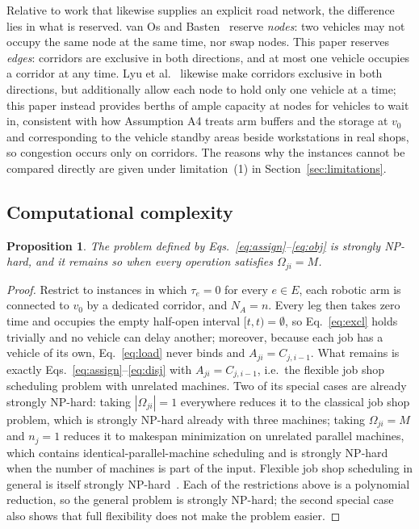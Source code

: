 \documentclass[manuscript,screen,review]{acmart}
\newtheorem{prop}{Proposition}
\begin{document}
Relative to work that likewise supplies an explicit road network, the difference lies in what is reserved. van Os and Basten~\cite{vanos2026exact}
reserve \emph{nodes}: two vehicles may not occupy the same node at the same time, nor swap nodes. This paper reserves \emph{edges}: corridors are exclusive in both directions, and at most one vehicle occupies a corridor at any time.
Lyu et al.~\cite{lyu2019approach} likewise make corridors exclusive in both directions, but additionally allow each node to hold only one vehicle at a time; this paper instead provides berths of ample capacity at nodes for vehicles to wait in, consistent with how Assumption A4 treats arm buffers and the storage at $v_0$ and corresponding to the vehicle standby areas beside workstations in real shops, so congestion occurs only on corridors.
The reasons why the instances cannot be compared directly are given under limitation~(1) in Section~\ref{sec:limitations}.

\subsection{Computational complexity}

\begin{prop}
\label{prop:np_hard}
The problem defined by Eqs.~\eqref{eq:assign}--\eqref{eq:obj} is strongly NP-hard, and it remains so when every operation satisfies
$\Omega_{ji}=M$.
\end{prop}

\begin{proof}
Restrict to instances in which $\tau_e=0$ for every $e\in E$, each robotic arm is connected to $v_0$ by a dedicated corridor,
and $N_A=n$. Every leg then takes zero time and occupies the empty half-open interval $[t,t)=\emptyset$, so Eq.~\eqref{eq:excl}
holds trivially and no vehicle can delay another; moreover, because each job has a vehicle of its own, Eq.~\eqref{eq:load} never binds and
$A_{ji}=C_{j,i-1}$. What remains is exactly
Eqs.~\eqref{eq:assign}--\eqref{eq:disj} with $A_{ji}=C_{j,i-1}$, i.e.\ the flexible job shop scheduling problem with unrelated machines. Two of its
special cases are already strongly NP-hard: taking $|\Omega_{ji}|=1$ everywhere reduces it to the classical job shop problem, which is
strongly NP-hard already with three machines; taking $\Omega_{ji}=M$ and $n_j=1$ reduces it to makespan minimization on unrelated parallel
machines, which contains identical-parallel-machine scheduling and is strongly NP-hard when the number of machines is part of the input.
Flexible job shop scheduling in general is itself strongly NP-hard~\cite{dauzereperes2024fjsp}. Each of the restrictions above is a
polynomial reduction, so the general problem is strongly NP-hard; the second special case also shows that full flexibility does not make the problem easier.
\end{proof}
\end{document}

